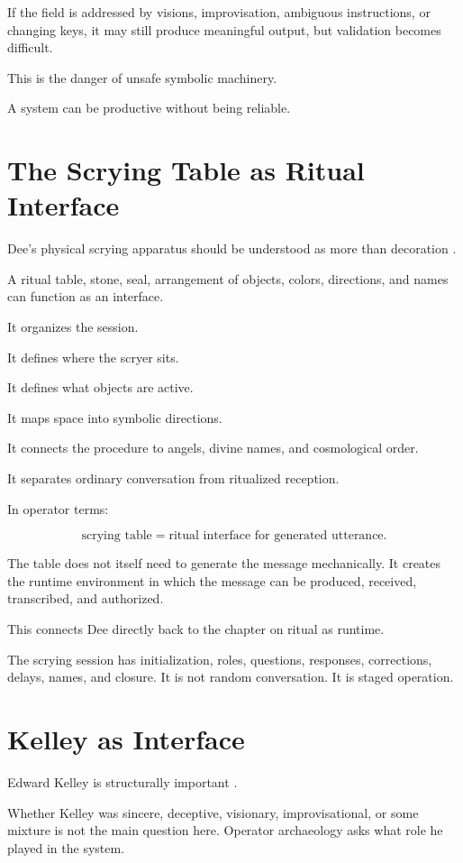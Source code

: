 \documentclass[11pt]{book}
\begin{document}
If the field is addressed by visions, improvisation, ambiguous instructions, or changing keys, it may still produce meaningful output, but validation becomes difficult.

This is the danger of unsafe symbolic machinery.

A system can be productive without being reliable.

\section{The Scrying Table as Ritual Interface}

Dee’s physical scrying apparatus should be understood as more than decoration \cite{DeeCasaubon1659TrueFaithfulRelation,Yates1964GiordanoBruno}.

A ritual table, stone, seal, arrangement of objects, colors, directions, and names can function as an interface.

It organizes the session.

It defines where the scryer sits.

It defines what objects are active.

It maps space into symbolic directions.

It connects the procedure to angels, divine names, and cosmological order.

It separates ordinary conversation from ritualized reception.

In operator terms:

\[
\text{scrying table} = \text{ritual interface for generated utterance}.
\]

The table does not itself need to generate the message mechanically. It creates the runtime environment in which the message can be produced, received, transcribed, and authorized.

This connects Dee directly back to the chapter on ritual as runtime.

The scrying session has initialization, roles, questions, responses, corrections, delays, names, and closure. It is not random conversation. It is staged operation.

\section{Kelley as Interface}

Edward Kelley is structurally important \cite{DeeCasaubon1659TrueFaithfulRelation,Yates1964GiordanoBruno}.

Whether Kelley was sincere, deceptive, visionary, improvisational, or some mixture is not the main question here. Operator archaeology asks what role he played in the system.
\end{document}
